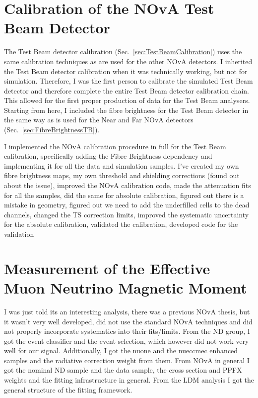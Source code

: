 \section*{Calibration of the NOvA Test Beam Detector}
The Test Beam detector calibration (Sec.~\ref{sec:TestBeamCalibration}) uses the same calibration techniques as are used for the other NOvA detectors. I inherited the Test Beam detector calibration when it was technically working, but not for simulation. Therefore, I was the first person to calibrate the simulated Test Beam detector and therefore complete the entire Test Beam detector calibration chain. This allowed for the first proper production of data for the Test Beam analysers. Starting from here, I included the fibre brightness for the Test Beam detector in the same way as is used for the Near and Far NOvA detectors (Sec.~\ref{sec:FibreBrightnessTB}).

I implemented the NOvA calibration procedure in full for the Test Beam calibration, specifically adding the Fibre Brightness dependency and implementing it for all the data and simulation samples. I've created my own fibre brightness maps, my own threshold and shielding corrections (found out about the issue), improved the NOvA calibration code, made the attenuation fits for all the samples, did the same for absolute calibration, figured out there is a mistake in geometry, figured out we need to add the underfilled cells to the dead channels, changed the TS correction limits, improved the systematic uncertainty for the absolute calibration, validated the calibration, developed code for the validation


\section*{Measurement of the Effective Muon Neutrino Magnetic Moment}
I was just told its an interesting analysis, there was a previous NOvA thesis, but it wasn't very well developed, did not use the standard NOvA techniques and did not properly incorporate systematics into their fits/limits. From the ND group, I got the event classifier and the event selection, which however did not work very well for our signal. Additionally, I got the nuone and the nueccmec enhanced samples and the radiative correction weight from them. From NOvA in general I got the nominal ND sample and the data sample, the cross section and PPFX weights and the fitting infrastructure in general. From the LDM analysis I got the general structure of the fitting framework.

